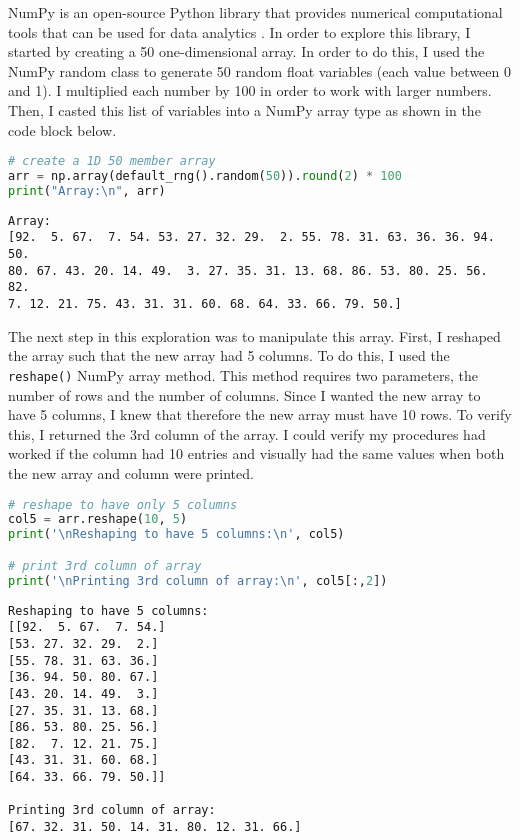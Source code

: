 \documentclass[journal]{IEEEtran}
\begin{document}
NumPy is an open-source Python library that provides numerical computational tools that can be used for data analytics \cite{b2}. In order to explore this library, I started by creating a 50 one-dimensional array. In order to do this, I used the NumPy random class to generate 50 random float variables (each value between 0 and 1). I multiplied each number by 100 in order to work with larger numbers. Then, I casted this list of variables into a NumPy array type as shown in the code block below. 
\begin{lstlisting}[language=Python, caption=Instantiating NumPy Array]
# create a 1D 50 member array 
arr = np.array(default_rng().random(50)).round(2) * 100
print("Array:\n", arr)
\end{lstlisting}
\begin{lstlisting}[caption={NumPy Array}]
Array:
[92.  5. 67.  7. 54. 53. 27. 32. 29.  2. 55. 78. 31. 63. 36. 36. 94. 50.
80. 67. 43. 20. 14. 49.  3. 27. 35. 31. 13. 68. 86. 53. 80. 25. 56. 82.
7. 12. 21. 75. 43. 31. 31. 60. 68. 64. 33. 66. 79. 50.]
\end{lstlisting}

The next step in this exploration was to manipulate this array. First, I reshaped the array such that the new array had 5 columns. To do this, I used the \lstinline{reshape()} NumPy array method. This method requires two parameters, the number of rows and the number of columns. Since I wanted the new array to have 5 columns, I knew that therefore the new array must have 10 rows. To verify this, I returned the 3rd column of the array. I could verify my procedures had worked if the column had 10 entries and visually had the same values when both the new array and column were printed. 
\begin{lstlisting}[language=Python, caption=Reshaping Array]
# reshape to have only 5 columns 
col5 = arr.reshape(10, 5)
print('\nReshaping to have 5 columns:\n', col5)

# print 3rd column of array 
print('\nPrinting 3rd column of array:\n', col5[:,2])
\end{lstlisting}
\begin{lstlisting}[caption={Reshaped Array}]
Reshaping to have 5 columns:
[[92.  5. 67.  7. 54.]
[53. 27. 32. 29.  2.]
[55. 78. 31. 63. 36.]
[36. 94. 50. 80. 67.]
[43. 20. 14. 49.  3.]
[27. 35. 31. 13. 68.]
[86. 53. 80. 25. 56.]
[82.  7. 12. 21. 75.]
[43. 31. 31. 60. 68.]
[64. 33. 66. 79. 50.]]

Printing 3rd column of array:
[67. 32. 31. 50. 14. 31. 80. 12. 31. 66.]
\end{lstlisting}
\end{document}
